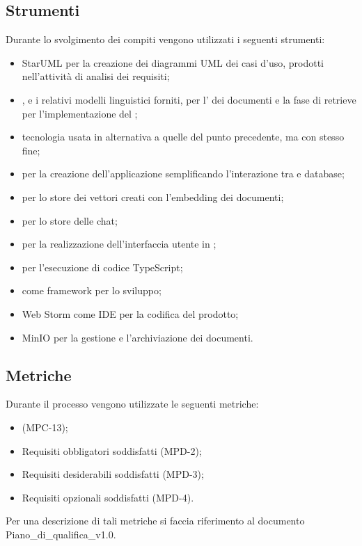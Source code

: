 \subsection{Strumenti}
Durante lo svolgimento dei compiti vengono utilizzati i seguenti strumenti:
\begin{itemize}
    \item StarUML per la creazione dei diagrammi UML dei casi d'uso, prodotti nell'attività di analisi dei requisiti;
    \item {}, e i relativi modelli linguistici forniti, per l' dei documenti e la fase di retrieve per l'implementazione del ;
    \item {} tecnologia usata in alternativa a quelle del punto precedente, ma con stesso fine;
    \item {} per la creazione dell'applicazione semplificando l'interazione tra  e database;
    \item {} per lo store dei vettori creati con l'embedding dei documenti;
    \item {} per lo store delle chat;
    \item {} per la realizzazione dell'interfaccia utente in ;
    \item {} per l'esecuzione di codice TypeScript;
    \item {} come framework per lo sviluppo;
    \item Web Storm come IDE per la codifica del prodotto;
    \item MinIO per la gestione e l'archiviazione dei documenti.
\end{itemize}

\subsection{Metriche}
Durante il processo vengono utilizzate le seguenti metriche:
\begin{itemize}
    \item {} (MPC-13);
    \item Requisiti obbligatori soddisfatti (MPD-2);
    \item Requisiti desiderabili soddisfatti (MPD-3);
    \item Requisiti opzionali soddisfatti (MPD-4).
\end{itemize}
Per una descrizione di tali metriche si faccia riferimento al documento Piano\_di\_qualifica\_v1.0.
\newpage


